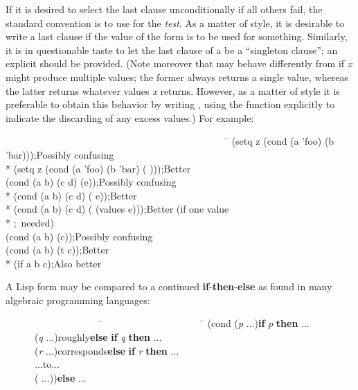 \begin{defmac}
If it is desired to select the last clause unconditionally if all others
fail, the standard convention is to use {\true} for the \emph{test}.
As a matter of style, it is desirable to write a last clause
\cd{({\true} {\false})} if the value of the  form is to be used
for something.  Similarly, it is in questionable
taste to let the last clause of
a  be a ``singleton clause''; an explicit {\true} should be provided.
(Note moreover that  may behave differently from
 if \emph{x} might produce multiple values;
the former always returns a single value, whereas the latter returns whatever
values \emph{x} returns.  However, as a matter of style it is preferable
to obtain this behavior by writing ,
using the  function explicitly to indicate the discarding
of any excess values.)
For example:
\begin{lisp}
~~~~~~~~~~~~~~~~~~~~~~~~~~~~~~~~~~~~~~~~~~~~~~\=\kill
(setq z (cond (a 'foo) (b 'bar)))\>;\textrm{Possibly confusing} \\*
(setq z (cond (a 'foo) (b 'bar) ({\true} {\false})))\>;\textrm{Better} \\
(cond (a b) (c d) (e))\>;\textrm{Possibly confusing} \\*
(cond (a b) (c d) ({\true} e))\>;\textrm{Better} \\*
(cond (a b) (c d) ({\true} (values e)))\>;\textrm{Better (if one value} \\*
                                       \>;~\textrm{needed)} \\
(cond (a b) (c))\>;\textrm{Possibly confusing} \\
(cond (a b) (t c))\>;\textrm{Better} \\*
(if a b c)\>;\textrm{Also better}
\end{lisp}
A Lisp  form may be compared to a continued \textbf{if}-\textbf{then}-\textbf{else}
as found in many algebraic programming languages:
\begin{lisp}
~~~~~~~~~~~~~~~~~~~~\=~~~~~~~~~~~~~~~~~~~~~\=\kill
(cond (\emph{p} ...)\>\>\textbf{if} \emph{p} \textbf{then} ... \\
~~~~~~(\emph{q} ...)\>\textrm{roughly}\>\textbf{else} \textbf{if} \emph{q} \textbf{then} ... \\
~~~~~~(\emph{r} ...)\>\textrm{corresponds}\>\textbf{else} \textbf{if} \emph{r} \textbf{then} ... \\
~~~~~~...\>\textrm{to}\>... \\
~~~~~~({\true} ...))\>\>\textbf{else} ...
\end{lisp}
\end{defmac}

